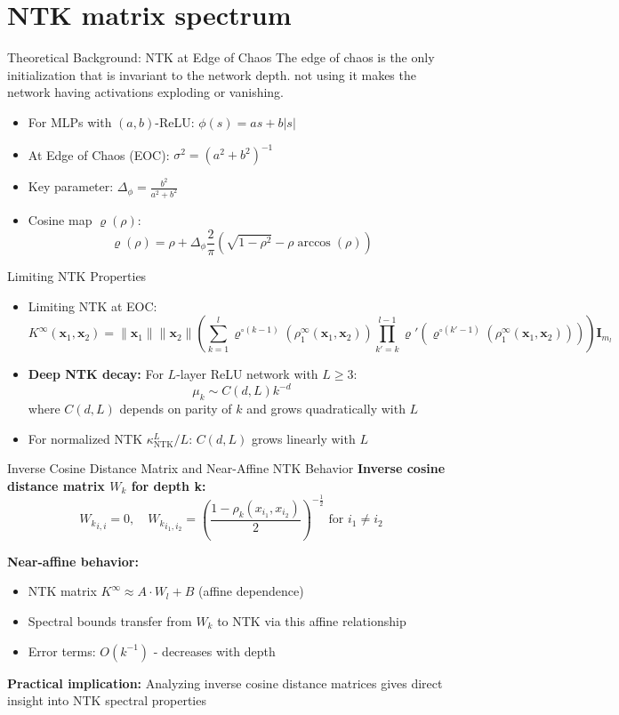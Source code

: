 \documentclass{beamer}
\newcommand{\limiting}[1]{#1^{\infty}}
\begin{document}
\section{NTK matrix spectrum}

\begin{frame}{Theoretical Background: NTK at Edge of Chaos}
    The edge of chaos is the only initialization that is invariant to the network depth. not using it makes the network having 
    activations exploding or vanishing.
\begin{itemize}
\item For MLPs with $(a,b)$-ReLU: $\phi(s) = as + b|s|$
\item At Edge of Chaos (EOC): $\sigma^2 = (a^2+b^2)^{-1}$
\item Key parameter: $\Delta_\phi = \frac{b^2}{a^2+b^2}$
\item Cosine map $\varrho(\rho)$:
\[ \varrho(\rho) = \rho + \Delta_\phi \frac{2}{\pi}\left( \sqrt{1-\rho^2} - \rho \arccos(\rho) \right) \]
\end{itemize}
\end{frame}

\begin{frame}{Limiting NTK Properties}
\begin{itemize}
\item Limiting NTK at EOC:
\[ K^{\infty}(\mathbf{x}_1, \mathbf{x}_2) = \|\mathbf{x}_1\| \|\mathbf{x}_2\| \left( \sum_{k=1}^l \varrho^{\circ (k-1)}\left(\rho_1^{\infty}(\mathbf{x}_1, \mathbf{x}_2)\right) \prod_{k'=k}^{l-1} \varrho'\left(\varrho^{\circ (k'-1)}\left(\rho_1^{\infty}(\mathbf{x}_1, \mathbf{x}_2)\right)\right) \right) \mathbf{I}_{m_l} \]


\item \textbf{Deep NTK decay:} For $L$-layer ReLU network with $L \geq 3$:
\[ \mu_k \sim C(d, L)k^{-d} \]
where $C(d, L)$ depends on parity of $k$ and grows quadratically with $L$
\item For normalized NTK $\kappa^L_{\text{NTK}}/L$: $C(d, L)$ grows linearly with $L$
\end{itemize}
\end{frame}


\begin{frame}{Inverse Cosine Distance Matrix and Near-Affine NTK Behavior}
\textbf{Inverse cosine distance matrix $W_k$ for depth k:}
\[ {W_k}_{i,i} = 0, \quad {W_k}_{i_1,i_2} = \left( \frac{1 - \rho_k(x_{i_1},x_{i_2})}{2} \right)^{-\frac{1}{2}} \text{ for } i_1 \neq i_2 \]

\textbf{Near-affine behavior:}
\begin{itemize}
\item NTK matrix $\limiting{K} \approx A \cdot W_l + B$ (affine dependence)
\item Spectral bounds transfer from $W_k$ to NTK via this affine relationship
\item Error terms: $O(k^{-1})$ - decreases with depth
\end{itemize}

\textbf{Practical implication:} Analyzing inverse cosine distance matrices gives direct insight into NTK spectral properties
\end{frame}
\end{document}
